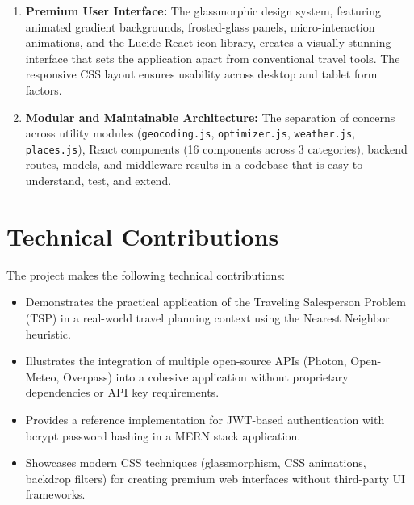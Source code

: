 \begin{enumerate}
    \item \textbf{Premium User Interface:} The glassmorphic design system, featuring animated gradient backgrounds, frosted-glass panels, micro-interaction animations, and the Lucide-React icon library, creates a visually stunning interface that sets the application apart from conventional travel tools. The responsive CSS layout ensures usability across desktop and tablet form factors.

    \item \textbf{Modular and Maintainable Architecture:} The separation of concerns across utility modules (\texttt{geocoding.js}, \texttt{optimizer.js}, \texttt{weather.js}, \texttt{places.js}), React components (16 components across 3 categories), backend routes, models, and middleware results in a codebase that is easy to understand, test, and extend.
\end{enumerate}

\section{Technical Contributions}
The project makes the following technical contributions:
\begin{itemize}
    \item Demonstrates the practical application of the Traveling Salesperson Problem (TSP) in a real-world travel planning context using the Nearest Neighbor heuristic.
    \item Illustrates the integration of multiple open-source APIs (Photon, Open-Meteo, Overpass) into a cohesive application without proprietary dependencies or API key requirements.
    \item Provides a reference implementation for JWT-based authentication with bcrypt password hashing in a MERN stack application.
    \item Showcases modern CSS techniques (glassmorphism, CSS animations, backdrop filters) for creating premium web interfaces without third-party UI frameworks.
\end{itemize}

